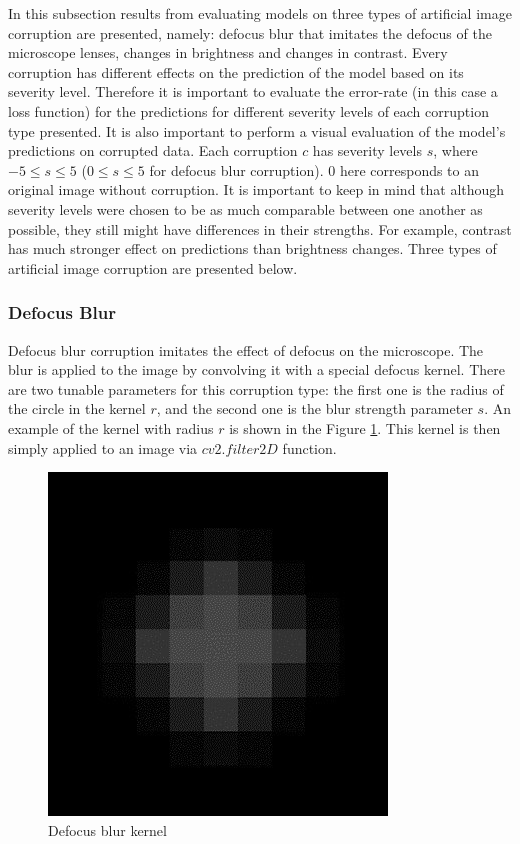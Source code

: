 
In this subsection results from evaluating models on three types of artificial image corruption are presented, namely: defocus blur that imitates the defocus of the microscope lenses, changes in brightness and changes in contrast. Every corruption  has different effects on the prediction of the model based on its severity level. Therefore it is important to evaluate the error-rate (in this case a loss function) for the predictions for different severity levels of each corruption type presented. It is also important to perform a visual evaluation of the model's predictions on corrupted data. Each corruption $c$ has severity levels $s$, where $-5 \leq s \leq 5$ ($0 \leq s \leq 5$ for defocus blur corruption). $0$ here corresponds to an original image without corruption. It is important to keep in mind that although severity levels were chosen to be as much comparable between one another as possible, they still might have differences in their strengths. For example, contrast has much stronger effect on predictions than brightness changes. Three types of artificial image corruption are presented below.

\subsubsection{Defocus Blur}
\label{section:defocus-blur}
Defocus blur corruption imitates the effect of defocus on the microscope. The blur is applied to the image by convolving it with a special defocus kernel. There are two tunable parameters for this corruption type: the first one is the radius of the circle in the kernel $r$, and the second one is the blur strength parameter $s$. An example of the kernel with radius $r$ is shown in the Figure \ref{fig:defocus-blur-kernel}. This kernel is then simply applied to an image via $cv2.filter2D$ function.

\begin{figure}[htb]
	\begin{center}
		\includegraphics[width=0.2\linewidth]{bilder/stability/defocus-blur-kernel.png}
		\caption{Defocus blur kernel}\label{fig:defocus-blur-kernel}
	\end{center}
\end{figure}

